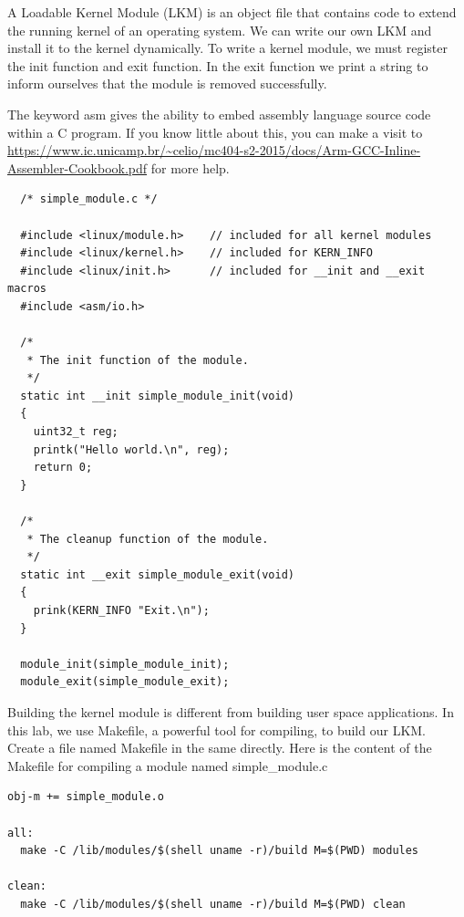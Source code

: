 A Loadable Kernel Module (LKM) is an object file that contains code to extend
the running kernel of an operating system. We can write our own LKM and install
it to the kernel dynamically. To write a kernel module, we must register the
init function and exit function. 
In the exit function we print a string to inform ourselves that the module is removed successfully.

The keyword asm gives the ability to embed assembly language source code within a C program. If you know little about this, you can make a visit to \url{https://www.ic.unicamp.br/~celio/mc404-s2-2015/docs/Arm-GCC-Inline-Assembler-Cookbook.pdf} for more help.


\begin{lstlisting}
  /* simple_module.c */
  
  #include <linux/module.h>    // included for all kernel modules
  #include <linux/kernel.h>    // included for KERN_INFO
  #include <linux/init.h>      // included for __init and __exit macros
  #include <asm/io.h>
  
  /*
   * The init function of the module.
   */
  static int __init simple_module_init(void)
  {
    uint32_t reg;
    printk("Hello world.\n", reg);
    return 0;
  }
  
  /*
   * The cleanup function of the module.
   */
  static int __exit simple_module_exit(void)
  {
    prink(KERN_INFO "Exit.\n");
  }
  
  module_init(simple_module_init);
  module_exit(simple_module_exit);

\end{lstlisting}

Building the kernel module is different from building user space applications. In this lab, we use Makefile, a powerful tool for compiling, to build our LKM. Create a file named Makefile in the same directly. Here is the content of the Makefile for compiling a module named simple\_module.c

\begin{lstlisting}
obj-m += simple_module.o

all:
  make -C /lib/modules/$(shell uname -r)/build M=$(PWD) modules

clean:
  make -C /lib/modules/$(shell uname -r)/build M=$(PWD) clean
\end{lstlisting}


